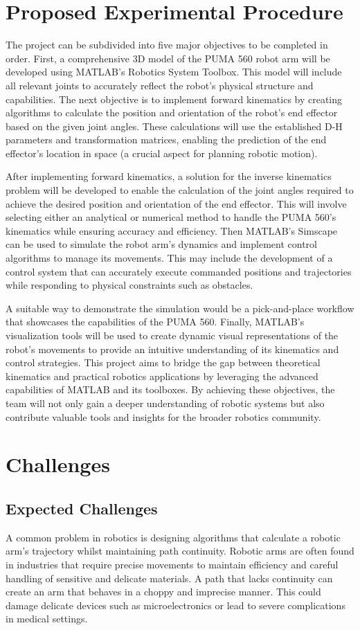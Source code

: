 \documentclass[conference]{IEEEtran}
\begin{document}
\section{Proposed Experimental Procedure}
The project can be subdivided into five major objectives to be completed in order. First, a comprehensive 3D model of the PUMA 560 robot arm will be developed using MATLAB’s Robotics System Toolbox. This model will include all relevant joints to accurately reflect the robot’s physical structure and capabilities. The next objective is to implement forward kinematics by creating algorithms to calculate the position and orientation of the robot’s end effector based on the given joint angles. These calculations will use the established D-H parameters and transformation matrices, enabling the prediction of the end effector’s location in space (a crucial aspect for planning robotic motion).

After implementing forward kinematics, a solution for the inverse kinematics problem will be developed to enable the calculation of the joint angles required to achieve the desired position and orientation of the end effector. This will involve selecting either an analytical or numerical method to handle the PUMA 560’s kinematics while ensuring accuracy and efficiency. Then MATLAB’s Simscape can be used to simulate the robot arm’s dynamics and implement control algorithms to manage its movements. This may include the development of a control system that can accurately execute commanded positions and trajectories while responding to physical constraints such as obstacles.

A suitable way to demonstrate the simulation would be a pick-and-place workflow that showcases the capabilities of the PUMA 560. Finally, MATLAB’s visualization tools will be used to create dynamic visual representations of the robot’s movements to provide an intuitive understanding of its kinematics and control strategies. This project aims to bridge the gap between theoretical kinematics and practical robotics applications by leveraging the advanced capabilities of MATLAB and its toolboxes. By achieving these objectives, the team will not only gain a deeper understanding of robotic systems but also contribute valuable tools and insights for the broader robotics community.

\section{Challenges}
\subsection{Expected Challenges}
A common problem in robotics is designing algorithms that calculate a robotic arm’s trajectory whilst maintaining path continuity. Robotic arms are often found in industries that require precise movements to maintain efficiency and careful handling of sensitive and delicate materials. A path that lacks continuity can create an arm that behaves in a choppy and imprecise manner. This could damage delicate devices such as microelectronics or lead to severe complications in medical settings. 
\end{document}
